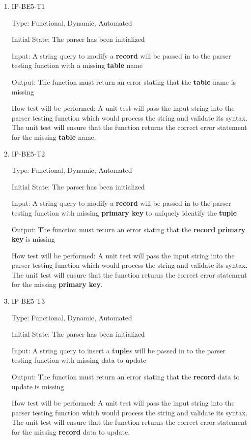 \documentclass[12pt, titlepage]{article}
\begin{document}
\begin{enumerate}
\item{IP-BE5-T1}

Type: Functional, Dynamic, Automated
					
Initial State: The parser has been initialized
					
Input: A string query to modify a \textbf{record} will be passed in to the parser testing function with a missing \textbf{table} name
					
Output: The function must return an error stating that the \textbf{table} name is missing
					
How test will be performed: A unit test will pass the input string into the parser testing function which would process the string and validate its syntax. The unit test will ensure that the function returns the correct error statement for the missing \textbf{table} name.

\item{IP-BE5-T2}

Type: Functional, Dynamic, Automated
					
Initial State: The parser has been initialized
					
Input: A string query to modify a \textbf{record} will be passed in to the parser testing function with missing \textbf{primary key} to uniquely identify the \textbf{tuple}
					
Output: The function must return an error stating that the \textbf{record} \textbf{primary key} is missing
					
How test will be performed: A unit test will pass the input string into the parser testing function which would process the string and validate its syntax. The unit test will ensure that the function returns the correct error statement for the missing \textbf{primary key}.

\item{IP-BE5-T3}

Type: Functional, Dynamic, Automated
					
Initial State: The parser has been initialized
					
Input: A string query to insert a \textbf{tuple}s will be passed in to the parser testing function with missing data to update
					
Output: The function must return an error stating that the \textbf{record} data to update is missing
					
How test will be performed: A unit test will pass the input string into the parser testing function which would process the string and validate its syntax. The unit test will ensure that the function returns the correct error statement for the missing \textbf{record} data to update.


\end{enumerate}
\end{document}
